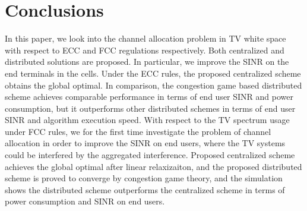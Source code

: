 \documentclass[times]{ettauth}
\theoremstyle{mytheoremstyle}
\theoremstyle{mytheoremstyle}
\theoremstyle{mytheoremstyle}
\begin{document}
\section{Conclusions}
In this paper, we look into the channel allocation problem in TV white space with respect to ECC and FCC regulations respectively.
Both centralized and distributed solutions are proposed. 
In particular, we improve the SINR on the end terminals in the cells.
Under the ECC rules, the proposed centralized scheme obtains the global optimal.
In comparison, the congestion game based distributed scheme achieves comparable performance in terms of end user SINR and power consumption, but it outperforms other distributed schemes in terms of end user SINR and algorithm execution speed.
With respect to the TV spectrum usage under FCC rules, we for the first time investigate the problem of channel allocation in order to improve the SINR on end users, where the TV systems could be interfered by the aggregated interference.
Proposed centralized scheme achieves the global optimal after linear relaxizaiton, and the proposed distributed scheme is proved to converge by congestion game theory, and the simulation shows the distributed scheme outperforms the centralized scheme in terms of power consumption and SINR on end users.






\end{document}
